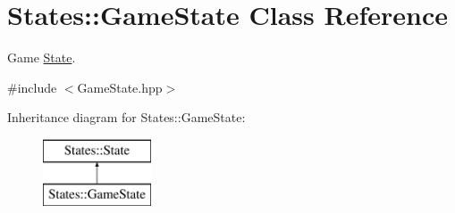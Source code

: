 \hypertarget{class_states_1_1_game_state}{}\section{States\+::Game\+State Class Reference}
\label{class_states_1_1_game_state}


Game \mbox{\hyperlink{class_states_1_1_state}{State}}.  




{\ttfamily \#include $<$Game\+State.\+hpp$>$}

Inheritance diagram for States\+::Game\+State\+:\begin{figure}[H]
\begin{center}
\leavevmode
\includegraphics[height=2.000000cm]{class_states_1_1_game_state}
\end{center}
\end{figure}
